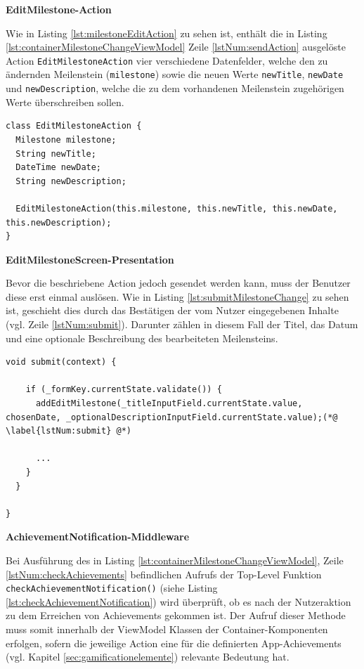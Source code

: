 \documentclass[bibliography=totoc,listof=totoc,BCOR=5mm,DIV=12,oneside]{scrbook}
\begin{document}
{\par \bigskip \textbf{EditMilestone-Action}
\par Wie in Listing \ref{lst:milestoneEditAction} zu sehen ist, enthält die in Listing \ref{lst:containerMilestoneChangeViewModel} Zeile \ref{lstNum:sendAction} ausgelöste Action \texttt{EditMilestoneAction} vier verschiedene Datenfelder, welche 
den zu ändernden Meilenstein (\texttt{milestone}) sowie die neuen Werte \texttt{newTitle}, \texttt{newDate} und \texttt{newDescription}, welche die zu dem vorhandenen Meilenstein zugehörigen Werte überschreiben sollen.

\bigskip
\begin{lstlisting}[caption={Meilenstein Action Beispiel},captionpos=b, label=lst:milestoneEditAction]
class EditMilestoneAction {
  Milestone milestone;
  String newTitle;
  DateTime newDate;
  String newDescription;

  EditMilestoneAction(this.milestone, this.newTitle, this.newDate, this.newDescription);
}
\end{lstlisting}
\bigskip

\newpage

\par \bigskip \textbf{EditMilestoneScreen-Presentation}
\par Bevor die beschriebene Action jedoch gesendet werden kann, muss der Benutzer diese erst einmal auslösen. Wie in Listing \ref{lst:submitMilestoneChange} zu sehen ist, geschieht dies durch das Bestätigen der vom Nutzer eingegebenen Inhalte (vgl. Zeile \ref{lstNum:submit}). Darunter zählen in diesem Fall der Titel, das Datum und eine optionale Beschreibung des bearbeiteten Meilensteins.

\bigskip
\begin{lstlisting}[caption={Methode: Bestätigung einer Meilensteinänderung },captionpos=b, label=lst:submitMilestoneChange]
void submit(context) {

    if (_formKey.currentState.validate()) {
      addEditMilestone(_titleInputField.currentState.value, chosenDate, _optionalDescriptionInputField.currentState.value);(*@ \label{lstNum:submit} @*)

      ...
    }
  }
  
}
\end{lstlisting}


\par \bigskip \textbf{AchievementNotification-Middleware}
\par Bei Ausführung des in Listing \ref{lst:containerMilestoneChangeViewModel}, Zeile \ref{lstNum:checkAchievements} befindlichen Aufrufs der Top-Level Funktion \texttt{checkAchievementNotification()} (siehe Listing \ref{lst:checkAchievementNotification}) wird überprüft, ob es nach der Nutzeraktion zu dem Erreichen von Achievements gekommen ist. Der Aufruf dieser Methode muss somit innerhalb der ViewModel Klassen der Container-Komponenten erfolgen, sofern die jeweilige Action eine für die definierten App-Achievements (vgl. Kapitel \ref{sec:gamificationelemente}) relevante Bedeutung hat.

}
\end{document}
